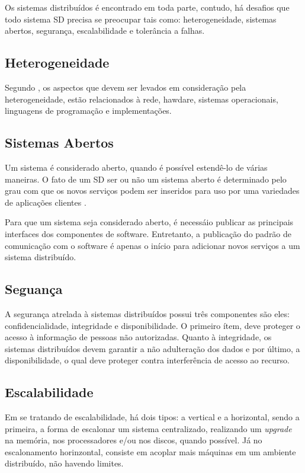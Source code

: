 \documentclass[
	12pt,				%
	oneside,			%
	a4paper,			%
	english,			%
	brazil				%
	]{abntex2ppgsi}
\begin{document}
Os sistemas distribuídos é encontrado em toda parte, contudo, há desafios que todo sistema SD precisa se preocupar tais como: heterogeneidade, sistemas abertos,  segurança, escalabilidade e tolerância a falhas.

\subsection{Heterogeneidade}

Segundo , os aspectos que devem ser levados em consideração pela heterogeneidade, estão relacionados à rede, hawdare, sistemas operacionais, linguagens de programação e implementações.

\subsection{Sistemas Abertos}

Um sistema é considerado aberto, quando é possível estendê-lo de várias maneiras. O fato de um SD ser ou não um sistema aberto é determinado pelo grau com que os novos serviços podem ser inseridos para uso por uma variedades de aplicações clientes \cite{coulouris2013sistemas}.

Para que um sistema seja considerado aberto, é necessáio publicar as principais interfaces dos componentes de software. Entretanto, a publicação do padrão de comunicação com o software é apenas o início para adicionar novos serviços a um sistema distribuído.

\subsection{Seguança}

A segurança atrelada à sistemas distribuídos possui três componentes são eles: confidencialidade, integridade e disponibilidade. O primeiro ítem, deve proteger o acesso à informação de pessoas não autorizadas. Quanto à integridade, os sistemas distribuídos devem garantir a não adulteração dos dados e por último, a disponibilidade, o qual deve proteger contra interferência de acesso ao recurso.

\subsection{Escalabilidade}

Em se tratando de escalabilidade, há dois tipos: a vertical e a horizontal, sendo a primeira, a forma de escalonar um sistema centralizado, realizando um \textit{upgrade} na memória, nos processadores e/ou nos discos, quando possível. Já no escalonamento horinzontal, consiste em acoplar mais máquinas em um ambiente distribuído, não havendo limites.
\end{document}
